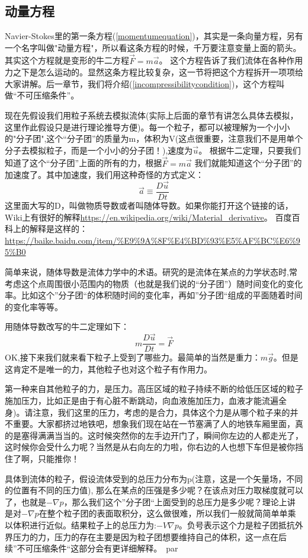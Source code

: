 \documentclass{article}
\begin{document}
\subsection{动量方程}
Navier-Stokes里的第一条方程(\ref{momentumequation})，其实是一条向量方程，另有一个名字叫做"动量方程"，所以看这条方程的时候，千万要注意变量上面的箭头。其实这个方程就是变形的牛二方程$\vec{F}=m\vec{a}$。 这个方程告诉了我们流体在各种作用力之下是怎么运动的。显然这条方程比较复杂，这一节将把这个方程拆开一项项给大家讲解。后一章节，我们将介绍(\ref{incompressibilitycondition})，这个方程叫做“不可压缩条件”。\par
现在先假设我们用粒子系统去模拟流体(实际上后面的章节有讲怎么具体去模拟，这里作此假设只是进行理论推导方便)。每一个粒子，都可以被理解为一个小小的"分子团",这个“分子团”的质量为m，体积为V(这点很重要，注意我们不是用单个分子去模拟粒子，而是一个小小的分子团！),速度为$\vec{u}$。 根据牛二定理，只要我们知道了这个“分子团”上面的所有的力，根据$\vec{F}=m\vec{a}$ 我们就能知道这个“分子团”的加速度了。其中加速度，我们用这种奇怪的方式定义：\begin{equation}
\vec{a}\equiv\frac{D\vec{u}}{Dt}
\end{equation}
这里面大写的D，叫做物质导数或者叫随体导数。如果你能打开这个链接的话，Wiki上有很好的解释\url{https://en.wikipedia.org/wiki/Material_derivative}。 百度百科上的解释是这样的：\url{https://baike.baidu.com/item/%E9%9A%8F%E4%BD%93%E5%AF%BC%E6%95%B0} \par
简单来说，随体导数是流体力学中的术语。研究的是流体在某点的力学状态时,常考虑这个点周围很小范围内的物质（也就是我们说的“分子团”）随时间变化的变化率。比如这个”分子团“的体积随时间的变化率，再如”分子团“组成的平面随着时间的变化率等等。\par
用随体导数改写的牛二定理如下：
\begin{equation}
m\frac{D\vec{u}}{Dt}=\vec{F}
\end{equation}
OK,接下来我们就来看下粒子上受到了哪些力。最简单的当然是重力：$m\vec{g}$。但是这肯定不是唯一的力，其他粒子也对这个粒子有作用力。\par
第一种来自其他粒子的力，是压力。高压区域的粒子持续不断的给低压区域的粒子施加压力，比如正是由于有心脏不断跳动，向血液施加压力，血液才能流遍全身)。请注意，我们这里的压力，考虑的是合力，具体这个力是从哪个粒子来的并不重要。大家都挤过地铁吧，想象我们现在站在一节塞满了人的地铁车厢里面，真的是塞得满满当当的。这时候突然你的左手边开门了，瞬间你左边的人都走光了，这时候你会受什么力呢？当然是从右向左的力啦，你右边的人也想下车但是被你挡住了啊，只能推你！\par
具体到流体的粒子，假设流体受到的总压力分布为p(注意，这是一个矢量场，不同的位置有不同的压力值), 那么在某点的压强是多少呢？在该点对压力取梯度就可以了，也就是$-\nabla p$，那么我们这个”分子团“上面受到的总压力是多少呢？理论上讲是对$-\nabla p$在整个粒子团的表面取积分，这么做很难，所以我们一般就简简单单乘以体积进行近似。结果粒子上的总压力为:$-V\nabla p$。负号表示这个力是粒子团抵抗外界压力的力，压力的存在主要是因为粒子团想要维持自己的体积，这一点在后续”不可压缩条件“这部分会有更详细解释。\ par
\end{document}
